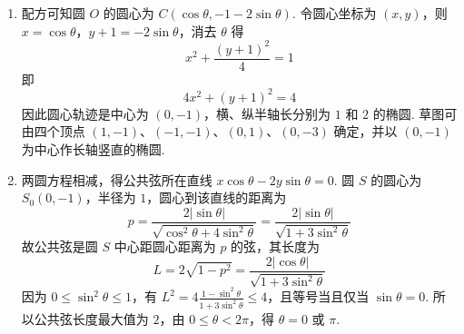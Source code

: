 \documentclass[UTF8,a4paper,oneside,11pt]{ctexbook}
\begin{document}
\begin{solution}
\begin{enumerate}
\item 配方可知圆 \(O\) 的圆心为 \(C\left(\cos\theta,-1-2\sin\theta\right)\). 令圆心坐标为 \((x,y)\)，则 \(x=\cos\theta\)，\(y+1=-2\sin\theta\)，消去 \(\theta\) 得
\[
x^2+\frac{(y+1)^2}{4}=1
\]
即
\[
4x^2+(y+1)^2=4
\]
因此圆心轨迹是中心为 \((0,-1)\)，横、纵半轴长分别为 \(1\) 和 \(2\) 的椭圆. 草图可由四个顶点 \((1,-1)\)、\((-1,-1)\)、\((0,1)\)、\((0,-3)\) 确定，并以 \((0,-1)\) 为中心作长轴竖直的椭圆.

\item 两圆方程相减，得公共弦所在直线 \(x\cos\theta-2y\sin\theta=0\). 圆 \(S\) 的圆心为 \(S_0(0,-1)\)，半径为 \(1\)，圆心到该直线的距离为
\[
p=\frac{2|\sin\theta|}{\sqrt{\cos^2\theta+4\sin^2\theta}}=\frac{2|\sin\theta|}{\sqrt{1+3\sin^2\theta}}
\]
故公共弦是圆 \(S\) 中心距圆心距离为 \(p\) 的弦，其长度为
\[
L=2\sqrt{1-p^2}=\frac{2|\cos\theta|}{\sqrt{1+3\sin^2\theta}}
\]
因为 \(0\leqslant\sin^2\theta\leqslant1\)，有 \(L^2=4\frac{1-\sin^2\theta}{1+3\sin^2\theta}\leqslant4\)，且等号当且仅当 \(\sin\theta=0\). 所以公共弦长度最大值为 \(2\)，由 \(0\leqslant\theta<2\pi\)，得 \(\theta=0\) 或 \(\pi\).
\end{enumerate}
\end{solution}

\end{document}
